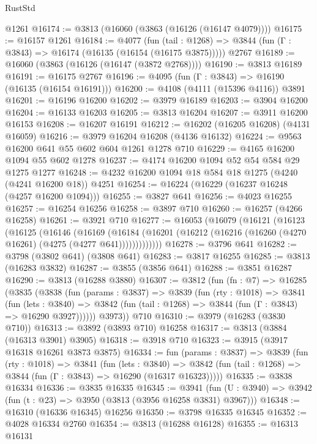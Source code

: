 \begin{lexlean}{RustStd}
\begin{coremodule}
{\begin{coremodule}
{{{{{{{{{{{{{{{{{{{{{{{{{{{{{{{{{{{    @1261
@16174 := @3813 (@16060 (@3863 (@16126 (@16147 @4079))))
@16175 := @16157 @1261
@16184 := @4077
    (fun (tail : @1268) => @3844 (fun (Γ : @3843) => @16174 (@16135 (@16154 (@16175 @3875)))))
    @2767
@16189 := @16060 (@3863 (@16126 (@16147 (@3872 @2768))))
@16190 := @3813 @16189
@16191 := @16175 @2767
@16196 := @4095 (fun (Γ : @3843) => @16190 (@16135 (@16154 @16191)))
@16200 := @4108 (@4111 (@15396 @4116)) @3891
@16201 := @16196 @16200
@16202 := @3979 @16189
@16203 := @3904 @16200
@16204 := @16133 @16203
@16205 := @3813 @16204
@16207 := @3911 @16200 @16153
@16208 := @16207 @16191
@16212 := @16202 (@16205 @16208) (@4131 @16059)
@16216 := @3979 @16204 @16208 (@4136 @16132)
@16224 := @9563 @16200 @641 @55 @602 @604 @1261 @1278 @710
@16229 := @4165 @16200 @1094 @55 @602 @1278
@16237 := @4174 @16200 @1094 @52 @54 @584 @29 @1275 @1277
@16248 := @4232 @16200 @1094 @18 @584 @18 @1275 (@4240 (@4241 @16200 @18)) @4251
@16254 := @16224 (@16229 (@16237 @16248 (@4257 @16200 @1094)))
@16255 := @3827 @641
@16256 := @4023 @16255
@16257 := @16254 @16256
@16258 := @3897 @710
@16260 := @16257 (@4266 @16258)
@16261 := @3921 @710
@16277 := @16053
    (@16079
      (@16121
        (@16123
          (@16125
            (@16146
              (@16169
                (@16184
                  (@16201 (@16212 (@16216 (@16260 (@4270 @16261) (@4275 (@4277 @641)))))))))))))
@16278 := @3796 @641
@16282 := @3798 (@3802 @641) (@3808 @641)
@16283 := @3817 @16255
@16285 := @3813 (@16283 @3832)
@16287 := @3855 (@3856 @641)
@16288 := @3851 @16287
@16290 := @3813 (@16288 @3880)
@16307 := @3812
    (fun (fn : @7) =>
    @16285
      (@3835
        (@3838
          (fun (params : @3837) =>
          @3839
            (fun (rty : @1018) =>
            @3841
              (fun (lets : @3840) =>
              @3842 (fun (tail : @1268) => @3844 (fun (Γ : @3843) => @16290 @3927))))))
        @3973))
    @710
@16310 := @3979 (@16283 (@3830 @710))
@16313 := @3892 (@3893 @710) @16258
@16317 := @3813 (@3884 (@16313 @3901) @3905)
@16318 := @3918 @710
@16323 := @3915 (@3917 @16318 @16261 @3873 @3875)
@16334 := fun (params : @3837) =>
  @3839
    (fun (rty : @1018) =>
    @3841
      (fun (lets : @3840) =>
      @3842 (fun (tail : @1268) => @3844 (fun (Γ : @3843) => @16290 (@16317 @16323)))))
@16335 := @3838 @16334
@16336 := @3835 @16335
@16345 := @3941
    (fun (U : @3940) => @3942 (fun (t : @23) => @3950 (@3813 (@3956 @16258 @3831) @3967)))
@16348 := @16310 (@16336 @16345) @16256
@16350 := @3798 @16335 @16345
@16352 := @4028 @16334 @2760
@16354 := @3813 (@16288 @16128)
@16355 := @16313 @16131
}}}}}}}}}}}}}}}}}}}}}}}}}}}}}}}}}}}
\end{coremodule}}
\end{coremodule}
\end{lexlean}
